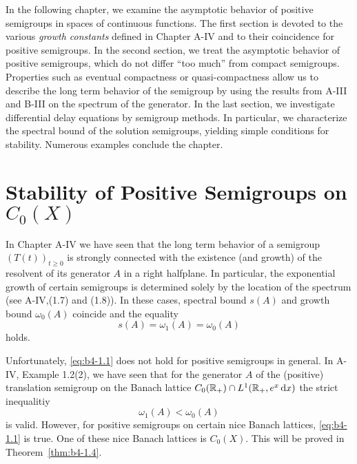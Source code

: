 \setcounter{chapter}{3}
\label{chap:b4}
In the following chapter, we examine the asymptotic behavior of positive semigroups in spaces of continuous functions.
The first section is devoted to the various \emph{growth constants} defined in Chapter A-IV and to their coincidence for positive semigroups.
In the second section, we treat the asymptotic behavior of positive semigroups, which do not differ \enquote{too much} from compact semigroups.
Properties such as eventual compactness or quasi-compactness allow us to describe the long term behavior of the semigroup by using the results from A-III and B-III on the spectrum of the generator.
In the last section, we investigate differential delay equations by semigroup methods. 
In particular, we characterize the spectral bound of the solution semigroups, yielding simple conditions for stability. 
Numerous examples conclude the chapter.

\section{Stability of Positive Semigroups on \texorpdfstring{$C_{0}(X)$}{C(X)}}\label{sec:b4-1}%
\hspace{1cm}{\Large by Frank Neubrander}
\vspace{.5cm}
\newline

In Chapter A-IV we have seen that the long term behavior of a semigroup $(T(t))_{t \geq 0}$ is strongly connected with the existence (and growth) of the resolvent of its generator $A$ in a right halfplane.
In particular, the exponential growth of certain semigroups is determined solely by the location of the spectrum (see A-IV,(1.7) and (1.8)).
In these cases, spectral bound $s(A)$ and growth bound $\omega_{0}(A)$ coincide and the equality
\begin{equation}\label{eq:b4-1.1}
   s(A) = \omega_1(A) = \omega_{0}(A)
\end{equation}
holds.

Unfortunately, \eqref{eq:b4-1.1} does not hold for positive semigroups in general.
In A-IV, Example 1.2(2), we have seen that for the generator $A$ of the (positive) translation semigroup on the Banach lattice $C_{0}(\mathbb{R}_+) \cap L^1(\mathbb{R}_+,e^x \mathop{}\!\mathrm{d}{x})$ the strict inequalitiy 
\[
\omega_1(A) < \omega_{0}(A)
\]
is valid.
However, for positive semigroups on certain nice Banach lattices, \eqref{eq:b4-1.1} is true.
One of these nice Banach lattices is $C_{0}(X)$. 
This will be proved in Theorem~\ref{thm:b4-1.4}.

